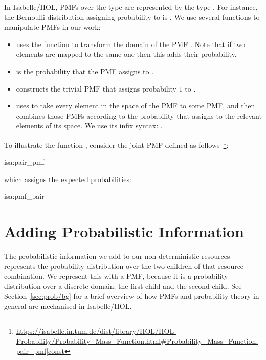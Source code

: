 \documentclass[class=smolathesis,crop=false]{standalone}
\begin{document}
In Isabelle/HOL, PMFs over the type  are represented by the type .
For instance, the Bernoulli distribution assigning probability  to  is .
We use several functions to manipulate PMFs in our work:
\begin{itemize}
  \item {} uses the function  to transform the domain of the PMF .
    Note that if two elements are mapped to the same one then this adds their probability.
  \item {} is the probability that the PMF  assigns to .
  \item {} constructs the trivial PMF that assigns probability $1$ to .
  \item {} uses  to take every element in the space of the PMF  to some PMF, and then combines those PMFs according to the probability that  assigns to the relevant elements of its space.
    We use its infix syntax: .
\end{itemize}

To illustrate the function , consider the joint PMF defined as follows~\footnote{\url{https://isabelle.in.tum.de/dist/library/HOL/HOL-Probability/Probability_Mass_Function.html\#Probability_Mass_Function.pair_pmf|const}}:
\begin{isadef}{isa:pair_pmf}
  
\end{isadef}
\noindent
which assigns the expected probabilities:
\begin{isalemma}{isa:pmf_pair}
  
\end{isalemma}

\section{Adding Probabilistic Information}
\label{sec:prob/add-prob-info}

The probabilistic information we add to our non-deterministic resources represents the probability distribution over the two children of that resource combination.
We represent this with a PMF, because it is a probability distribution over a discrete domain: the first child and the second child.
See Section~\ref{sec:prob/bg} for a brief overview of how PMFs and probability theory in general are mechanised in Isabelle/HOL.
\end{document}
